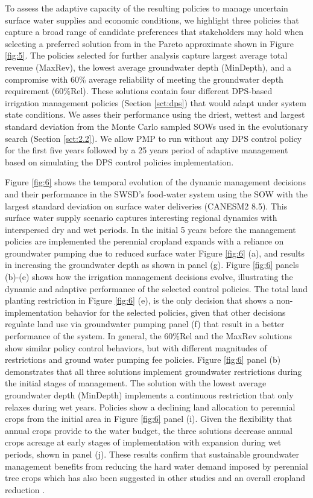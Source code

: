 \documentclass[a4paper,fleqn]{cas-sc}
\begin{document}
To assess the adaptive capacity of the resulting policies to manage uncertain surface water supplies and economic conditions, we highlight three policies that capture a broad range of candidate preferences that stakeholders may hold when selecting a preferred solution from in the Pareto approximate shown in Figure \ref{fig:5}. The policies selected for further analysis capture largest average total revenue (MaxRev), the lowest average groundwater depth (MinDepth), and a compromise with 60\% average reliability of meeting the groundwater depth requirement (60\%Rel). These solutions contain four different DPS-based irrigation management policies (Section \ref{sct:dps}) that would adapt under system state conditions. We asses their performance using the driest, wettest and largest standard deviation from the Monte Carlo sampled SOWs used in the evolutionary search (Section \ref{sct:2.2}). 
We allow PMP to run without any DPS control policy for the first five years followed by a 25 years period of adaptive management based on simulating the DPS control policies implementation. 

Figure \ref{fig:6} shows the temporal evolution of the dynamic management decisions and their performance in the SWSD's food-water system using the SOW with the largest standard deviation on surface water deliveries 
(CANESM2 8.5). This surface water supply scenario captures interesting regional dynamics with interspersed dry and wet periods. In the initial 5 years before the management policies are implemented the perennial cropland expands with a reliance on groundwater pumping due to reduced surface water Figure \ref{fig:6} (a), and results in increasing the groundwater depth as shown in panel (g). Figure \ref{fig:6} panels (b)-(e) shows how the irrigation management decisions evolve, illustrating the dynamic and adaptive performance of the selected control policies. The total land planting restriction in Figure \ref{fig:6} (e), is the only decision that shows a non-implementation behavior for the selected policies, given that other decisions regulate land use via groundwater pumping panel (f) that result in a better performance of the system. In general, the 60\%Rel and the MaxRev solutions show similar policy control behaviors, but with different magnitudes of restrictions and ground water pumping fee policies. Figure \ref{fig:6} panel (b) demonstrates that all three solutions implement groundwater restrictions during the initial stages of management. The solution with the lowest average groundwater depth (MinDepth) implements a continuous restriction that only relaxes during wet years. Policies show a declining land allocation to perennial crops from the initial area in Figure \ref{fig:6} panel (i). Given the flexibility that annual crops provide to the water budget, the three solutions decrease annual crops acreage at early stages of implementation with expansion during wet periods, shown in panel (j). These results confirm that sustainable groundwater management benefits from reducing the hard water demand imposed by perennial tree crops which has also been suggested in other studies \citep{qin_flexibility_2019,mall_water_2019} and an overall cropland reduction \citep{hanak_water_2019}. 
\end{document}
